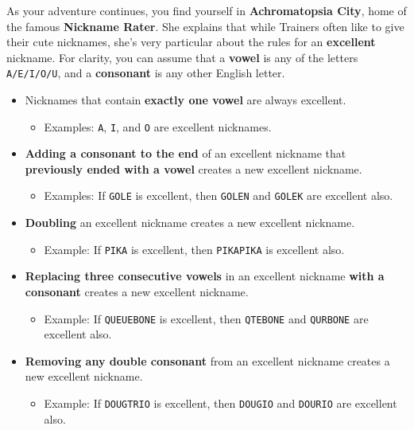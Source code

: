 

As your adventure continues, you find yourself in
\textbf{Achromatopsia City}, home of the famous \textbf{Nickname Rater}.
She explains that while Trainers often like to give their
\mappMobimon{} cute nicknames, she's very particular about the rules
for an \textbf{excellent} nickname. For clarity, you can assume
that a \textbf{vowel} is any of the letters \texttt{A/E/I/O/U}, and a
\textbf{consonant} is any other English letter.

\begin{itemize}
  \item Nicknames that contain \textbf{exactly one vowel} are always excellent.
    \begin{itemize}
      \item Examples: \texttt{A}, \texttt{I}, and \texttt{O} are
            excellent nicknames.
    \end{itemize}
  \item \textbf{Adding a consonant to the end} of an excellent nickname
        that \textbf{previously ended with a vowel}
        creates a new excellent nickname.
    \begin{itemize}
      \item Examples: If \texttt{GOLE} is excellent, then
            \texttt{GOLEN} and \texttt{GOLEK} are excellent also.
    \end{itemize}
  \item \textbf{Doubling} an excellent nickname creates a new excellent
        nickname.
    \begin{itemize}
      \item Example: If \texttt{PIKA} is excellent, then
            \texttt{PIKAPIKA} is excellent also.
    \end{itemize}
  \item \textbf{Replacing three consecutive vowels} in
        an excellent nickname \textbf{with a consonant}
        creates a new excellent nickname.
    \begin{itemize}
      \item Example: If \texttt{QUEUEBONE} is excellent, then
        \texttt{QTEBONE} and \texttt{QURBONE} are excellent also.
    \end{itemize}
  \item \textbf{Removing any double consonant} from an excellent nickname
        creates a new excellent nickname.
    \begin{itemize}
      \item Example: If \texttt{DOUGTRIO} is excellent, then
        \texttt{DOUGIO} and \texttt{DOURIO} are excellent also.
    \end{itemize}
\end{itemize}

